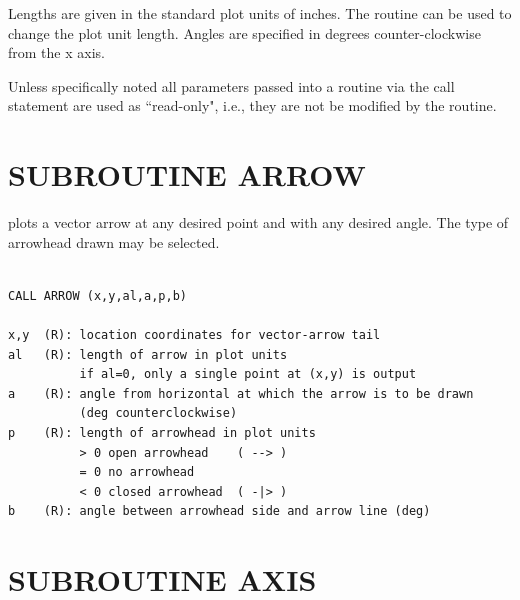 \documentclass[11pt]{report}
\begin{document}
Lengths are given in the standard plot units of inches.  The routine
 can be used to change the plot unit length.  Angles are specified
in degrees counter-clockwise from the x axis.

Unless specifically noted all parameters passed into a routine via the
call statement are used as ``read-only", i.e., they are
not be modified by the routine.

\section{SUBROUTINE ARROW}

 plots a vector arrow at any desired point and with any desired
angle.  The type of arrowhead drawn may be selected.
\begin{verbatim}

CALL ARROW (x,y,al,a,p,b)

x,y  (R): location coordinates for vector-arrow tail
al   (R): length of arrow in plot units
          if al=0, only a single point at (x,y) is output
a    (R): angle from horizontal at which the arrow is to be drawn
          (deg counterclockwise)
p    (R): length of arrowhead in plot units
          > 0 open arrowhead    ( --> )
          = 0 no arrowhead
          < 0 closed arrowhead  ( -|> )
b    (R): angle between arrowhead side and arrow line (deg)
\end{verbatim}

\section{SUBROUTINE AXIS}
\end{document}
